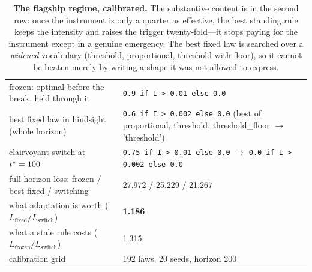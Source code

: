 \begin{table}[t]\centering\small
\caption{\textbf{The flagship regime, calibrated.} The substantive content is in the second row:
once the instrument is only a quarter as effective, the best standing rule keeps the intensity and
raises the trigger twenty-fold---it stops paying for the instrument except in a genuine emergency.
The best fixed law is searched over a \emph{widened} vocabulary (threshold, proportional,
threshold-with-floor), so it cannot be beaten merely by writing a shape it was not allowed to
express.}
\label{tab:regime}
\begin{tabular}{@{}l l@{}}
\toprule
frozen: optimal before the break, held through it & \texttt{0.9 if I > 0.01 else 0.0} \\
best fixed law in hindsight (whole horizon) & \texttt{0.6 if I > 0.002 else 0.0}
  {\footnotesize (best of proportional, threshold, threshold\_floor $\to$ 'threshold')} \\
clairvoyant switch at $t^{\star}=100$ &
  \texttt{0.75 if I > 0.01 else 0.0} $\to$ \texttt{0.0 if I > 0.002 else 0.0} \\
\midrule
full-horizon loss: frozen / best fixed / switching &
  27.972 / 25.229 / 21.267 \\
what adaptation is worth ($L_{\text{fixed}}/L_{\text{switch}}$) &
  \textbf{1.186} \\
what a stale rule costs ($L_{\text{frozen}}/L_{\text{switch}}$) &
  1.315 \\
calibration grid & 192 laws, 20 seeds, horizon 200 \\
\bottomrule
\end{tabular}
\end{table}
